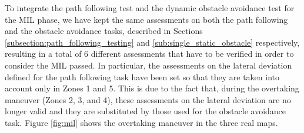 To integrate the path following test and the dynamic obstacle avoidance test for the MIL phase, we have kept the same assessments on both the path following and the obstacle avoidance tasks, described in Sections \ref{subsection:path_following_testing} and \ref{sub:single_static_obstacle} respectively, resulting in a total of 6 different assessments that have to be verified in order to consider the MIL passed.
In particular, the assessments on the lateral deviation defined for the path following task have been set so that they are taken into account only in Zones 1 and 5. This is due to the fact that, during the overtaking maneuver (Zones 2, 3, and 4), these assessments on the lateral deviation are no longer valid and they are substituted by those used for the obstacle avoidance task.
Figure \ref{fig:mil} shows the overtaking maneuver in the three real maps.
